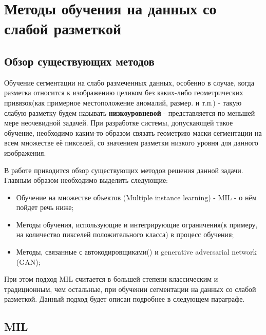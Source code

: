 \chapter{Методы обучения на данных со слабой разметкой} \label{chapt2}

\section{Обзор существующих методов} \label{sect2_1}

Обучение сегментации на слабо размеченных данных, особенно в случае, когда разметка относится к изображению целиком без каких-либо геометрических привязок(как примерное местоположение аномалий, размер. и т.п.) - такую слабую разметку будем называть {\bf низкоуровневой} - представляется по меньшей мере неочевидной задачей. При разработке системы, допускающей такое обучение, необходимо каким-то образом связать геометрию маски сегментации на всем множестве её пикселей, со значением разметки низкого уровня для данного изображения.

В работе \cite{lu_survey_2018} приводится обзор существующих методов решения данной задачи. Главным образом необходимо выделить следующие:

\begin{itemize}
    \item Обучение на множестве объектов (Multiple instance learning) - MIL - о нём пойдет речь ниже;
    \item Методы обучения, использующие и интегрирующие ограничения(к примеру, на количество пикселей положительного класса) в процесс обучения;
    \item Методы, связанные с автокодировщиками(\cite{alex_semisupervised_2017}) и generative adversarial network (GAN);
\end{itemize}


\noindent При этом подход MIL считается в большей степени классическим и традиционным, чем остальные, при обучении сегментации на данных со слабой разметкой. Данный подход будет описан подробнее в следующем параграфе.

\section{MIL}

